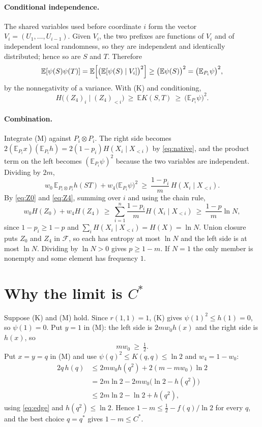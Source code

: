 \documentclass[12pt]{article}
\theoremstyle{plain}
\newcommand{\EE}{\mathbb{E}}
\newcommand{\cF}{\mathcal{F}}
\newcommand{\qs}{q^{*}}
\newcommand{\Cs}{C^{*}}
\begin{document}
\paragraph*{Conditional independence.} The shared variables used before coordinate $i$ form the vector $V_i=(U_1,\dots,U_{i-1})$. Given $V_i$, the two prefixes are functions of $V_i$ and of independent local randomness, so they are independent and identically distributed; hence so are $S$ and $T$. Therefore
\[
\EE[\psi(S)\psi(T)]=\EE\Bigl[\bigl(\EE[\psi(S)\mid V_i]\bigr)^2\Bigr]\ge\bigl(\EE\psi(S)\bigr)^2=\bigl(\EE_{P_i}\psi\bigr)^2,
\]
by the nonnegativity of a variance. With (K) and conditioning,
\begin{equation}\label{eq:Z4}
H\bigl((Z_4)_i\mid(Z_4)_{<i}\bigr)\ \ge\ \EE K(S,T)\ \ge\ \bigl(\EE_{P_i}\psi\bigr)^2 .
\end{equation}

\paragraph*{Combination.} Integrate (M) against $P_i\otimes P_i$. The right side becomes $2(\EE_{P_i}x)(\EE_{P_i}h)=2(1-p_i)H(X_i\mid X_{<i})$ by \eqref{eq:native}, and the product term on the left becomes $(\EE_{P_i}\psi)^2$ because the two variables are independent. Dividing by $2m$,
\[
w_0\,\EE_{P_i\otimes P_i}h(ST)+w_4\bigl(\EE_{P_i}\psi\bigr)^2\ \ge\ \frac{1-p_i}{m}\,H(X_i\mid X_{<i}).
\]
By \eqref{eq:Z0} and \eqref{eq:Z4}, summing over $i$ and using the chain rule,
\[
w_0H(Z_0)+w_4H(Z_4)\ \ge\ \sum_{i=1}^n\frac{1-p_i}{m}H(X_i\mid X_{<i})\ \ge\ \frac{1-p}{m}\ln N,
\]
since $1-p_i\ge 1-p$ and $\sum_iH(X_i\mid X_{<i})=H(X)=\ln N$. Union closure puts $Z_0$ and $Z_4$ in $\cF$, so each has entropy at most $\ln N$ and the left side is at most $\ln N$. Dividing by $\ln N>0$ gives $p\ge 1-m$. If $N=1$ the only member is nonempty and some element has frequency $1$.

\section{Why the limit is \texorpdfstring{$\Cs$}{C*}}\label{app:limit}

Suppose (K) and (M) hold. Since $r(1,1)=1$, (K) gives $\psi(1)^2\le h(1)=0$, so $\psi(1)=0$. Put $y=1$ in (M): the left side is $2mw_0h(x)$ and the right side is $h(x)$, so
\begin{equation}\label{eq:edge}
mw_0\ \ge\ \tfrac12 .
\end{equation}
Put $x=y=q$ in (M) and use $\psi(q)^2\le K(q,q)\le\ln 2$ and $w_4=1-w_0$:
\begin{align*}
2q\,h(q)&\le 2mw_0h(q^2)+2(m-mw_0)\ln 2\\
&= 2m\ln2-2mw_0\bigl(\ln2-h(q^2)\bigr)\\
&\le 2m\ln 2-\ln2+h(q^2),
\end{align*}
using \eqref{eq:edge} and $h(q^2)\le\ln 2$. Hence $1-m\le\frac12-f(q)/\ln2$ for every $q$, and the best choice $q=\qs$ gives $1-m\le\Cs$.
\end{document}
